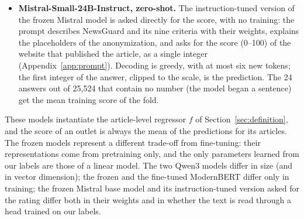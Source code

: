 \documentclass[11pt,a4paper]{article}
\begin{document}
\begin{itemize}
        with 150 million parameters and a context of 8,192 tokens, trained end to end to regress the score: squared
        error on $s/100$, AdamW with learning rate $3 \cdot 10^{-5}$ and weight decay 0.01 (none on biases and
        normalization weights), linear schedule with 6\% warm-up, batches of 4 articles with gradient accumulation to
        an effective batch of 32, 5 epochs, mixed precision; the model of the last epoch is kept.
  \item \textbf{Mistral-Small-24B-Instruct, zero-shot.} The instruction-tuned version of the frozen Mistral model is
        asked directly for the score, with no training: the prompt describes NewsGuard and its nine criteria with their
        weights, explains the placeholders of the anonymization, and asks for the score (0--100) of the website that
        published the article, as a single integer (Appendix~\ref{app:prompt}). Decoding is greedy, with at most six new
        tokens; the first integer of the answer, clipped to the scale, is the prediction. The 24 answers out of 25,524
        that contain no number (the model began a sentence) get the mean training score of the fold.
\end{itemize}
These models instantiate the article-level regressor $f$ of Section~\ref{sec:definition}, and the score of an outlet is
always the mean of the predictions for its articles. The frozen models represent a different trade-off from
fine-tuning: their representations come from pretraining only, and the only parameters learned from our labels are those
of a linear model. The two Qwen3 models differ in size (and in vector dimension); the frozen and the fine-tuned ModernBERT differ only in
training; the frozen Mistral base model and its instruction-tuned version asked for the rating differ both in their weights and
in whether the text is read through a head trained on our labels.
\end{document}
